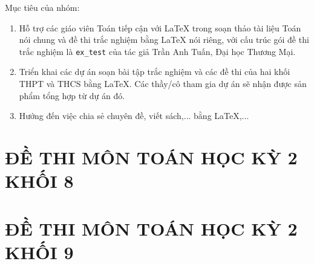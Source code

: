 \documentclass[12pt,a4paper,oneside]{book}
\begin{document}
\vspace{0.6cm}

\noindent Mục tiêu của nhóm: 
\begin{enumerate}
\item Hỗ trợ các giáo viên Toán tiếp cận với \LaTeX{} trong soạn thảo tài liệu Toán nói chung và đề thi trắc nghiệm bằng \LaTeX{} nói riêng, với cấu trúc gói đề thi trắc nghiệm là \texttt{ex\_test} của tác giả Trần Anh Tuấn, Đại học Thương Mại.
\item Triển khai các dự án soạn bài tập trắc nghiệm và các đề thi của hai khối THPT và THCS bằng \LaTeX{}. Các thầy/cô tham gia dự án sẽ nhận được sản phẩm tổng hợp từ dự án đó.
\item Hướng đến việc chia sẻ chuyên đề, viết sách,... bằng \LaTeX,...
\end{enumerate}

\chapter{ĐỀ THI MÔN TOÁN HỌC KỲ 2 KHỐI 8}
%





 
  






 




%
\chapter{ĐỀ THI MÔN TOÁN HỌC KỲ 2 KHỐI 9}













\end{document}
